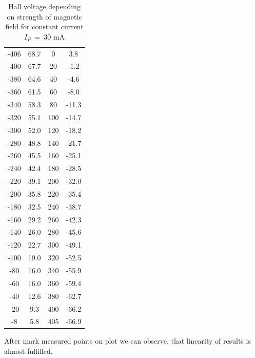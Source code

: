 \documentclass[a4paper,12pt]{article}
\begin{document}
\begin{table}[H]
\begin{minipage}[t]{.40\textwidth}
\begin{tabular}{ | c | c || c | c |}
            -406 & 68.7 & 0 & 3.8\\
            -400 & 67.7 & 20 & -1.2\\
            -380 & 64.6 & 40 & -4.6\\
            -360 & 61.5 & 60 & -8.0\\
            -340 & 58.3 & 80 & -11.3\\
            -320 & 55.1 & 100 & -14.7\\
            -300 & 52.0 & 120 & -18.2\\
            -280 & 48.8 & 140 & -21.7\\
            -260 & 45.5 & 160 & -25.1\\
            -240 & 42.4 & 180 & -28.5\\
            -220 & 39.1 & 200 & -32.0\\
            -200 & 35.8 & 220 & -35.4\\
            -180 & 32.5 & 240 & -38.7\\
            -160 & 29.2 & 260 & -42.3\\
            -140 & 26.0 & 280 & -45.6\\
            -120 & 22.7 & 300 & -49.1\\
            -100 & 19.0 & 320 & -52.5\\
            -80 & 16.0 & 340 & -55.9\\
            -60 & 16.0 & 360 & -59.4\\
            -40 & 12.6 & 380 & -62.7\\
            -20 & 9.3 & 400 & -66.2\\
            -8 & 5.8 & 405 & -66.9\\

      \hline
      \end{tabular}
      \caption{Hall voltage depending on strength of magnetic field for constant current $I_P$~=~30 mA}
    \end{minipage}
    \end{table}

    After mark measured points on plot we can observe, that linearity of results is almost fulfilled.
\end{document}
